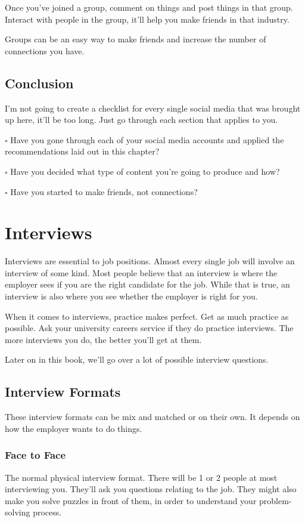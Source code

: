 \documentclass{article}
\begin{document}
Once you've joined a group, comment on things and post things in that
group. Interact with people in the group, it'll help you make friends in
that industry.

Groups can be an easy way to make friends and increase the number of
connections you have.
\subsection{Conclusion}
I'm not going to create a checklist for every single social media that
was brought up here, it'll be too long. Just go through each section
that applies to you.

$\square$ Have you gone through each of your social media accounts and applied
the recommendations laid out in this chapter?

$\square$ Have you decided what type of content you're going to produce and how?

$\square$ Have you started to make friends, not connections?
\newpage
\section{Interviews}
Interviews are essential to job positions. Almost every single job will
involve an interview of some kind. Most people believe that an interview
is where the employer sees if you are the right candidate for the job.
While that is true, an interview is also where you see whether the
employer is right for you.

When it comes to interviews, practice makes perfect. Get as much
practice as possible. Ask your university careers service if they do
practice interviews. The more interviews you do, the better you'll get
at them.

Later on in this book, we'll go over a lot of possible interview
questions.
\subsection{Interview Formats}
These interview formats can be mix and matched or on their own. It
depends on how the employer wants to do things.
\subsubsection{Face to Face}
The normal physical interview format. There will be 1 or 2 people at
most interviewing you. They'll ask you questions relating to the job.
They might also make you solve puzzles in front of them, in order to
understand your problem-solving process.
\end{document}
